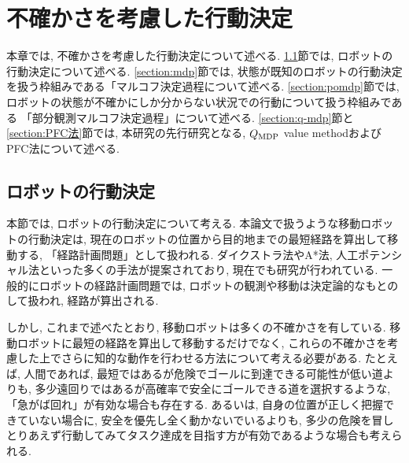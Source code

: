 \chapter{不確かさを考慮した行動決定} \label{chapter:pomdp}

本章では, 不確かさを考慮した行動決定について述べる. 
\ref{section:ロボットの行動決定}節では, ロボットの行動決定について述べる. 
\ref{section:mdp}節では, 状態が既知のロボットの行動決定を扱う枠組みである「マルコフ決定過程について述べる. 
\ref{section:pomdp}節では, ロボットの状態が不確かにしか分からない状況での行動について扱う枠組みである
「部分観測マルコフ決定過程」について述べる. 
\ref{section:q-mdp}節と\ref{section:PFC法}節では, 
本研究の先行研究となる, $Q_{\rm MDP}$ value methodおよびPFC法について述べる. 



\section{ロボットの行動決定} \label{section:ロボットの行動決定}
本節では, ロボットの行動決定について考える. 
本論文で扱うような移動ロボットの行動決定は, 現在のロボットの位置から目的地までの最短経路を算出して移動する, 「経路計画問題」として扱われる. 
ダイクストラ法やA*法, 人工ポテンシャル法といった多くの手法が提案されており, 現在でも研究が行われている. 
一般的にロボットの経路計画問題では, ロボットの観測や移動は決定論的なもとのして扱われ, 経路が算出される. 

しかし, これまで述べたとおり, 移動ロボットは多くの不確かさを有している. 
移動ロボットに最短の経路を算出して移動するだけでなく, これらの不確かさを考慮した上でさらに知的な動作を行わせる方法について考える必要がある. 
たとえば, 人間であれば, 最短ではあるが危険でゴールに到達できる可能性が低い道よりも, 多少遠回りではあるが高確率で安全にゴールできる道を選択するような, 
「急がば回れ」が有効な場合も存在する. 
あるいは, 自身の位置が正しく把握できていない場合に, 安全を優先し全く動かないでいるよりも, 
多少の危険を冒しとりあえず行動してみてタスク達成を目指す方が有効であるような場合も考えられる. 


